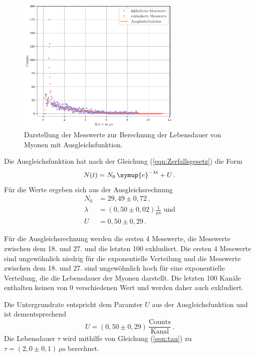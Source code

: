 \begin{figure}
  \centering
  \includegraphics[width=0.70\textwidth]{Lebensdauer_der_Myonen.pdf}
  \caption{Darstellung der Messwerte zur Berechnung der Lebensdauer von Myonen mit Ausgleichsfunktion.}
  \label{fig:Lebensdauer_Myonen}
\end{figure}

Die Ausgleichsfunktion hat nach der Gleichung (\ref{eqn:Zerfallsgesetz}) die Form 
$$ N(t) = N_0 \,\symup{e}^{-\lambda t} + U \,.$$
Für die Werte ergeben sich aus der Ausgleichsrechnung 
\begin{align*}
  N_0 &= 29,49 \pm 0,72 \, ,\\
  \lambda &= (0,50 \pm 0,02) \frac{1}{\unit{\mu\second}} \,\, \text{und}\\
  U &= 0,50 \pm 0,29 \, .
\end{align*}

Für die Ausgleichsrechnung werden 
die ersten 4 Messwerte, die Messwerte zwischen dem 18. und 27. und die letzten 100 exkludiert. Die ersten 4
Messwerte sind ungewöhnlich niedrig für die exponentielle Verteilung und die Messwerte zwischen dem 18. und 27. sind ungewöhnlich hoch für eine exponentielle Verteilung, die die Lebensdauer der Myonen darstellt. Die letzten 100 Kanäle enthalten keinen von 0 verschiedenen Wert und werden daher auch exkludiert. 

Die Untergrundrate entspricht dem Paramter $U$ aus der Ausgleichsfunktion 
und ist dementsprechend $$U = (0,50 \pm 0,29) \, \frac{\text{Counts}}{\text{Kanal}}\,.$$
Die Lebensdauer $\tau$ wird mithilfe von Gleichung (\ref{eqn:tau}) zu 
$\tau = (2,0 \pm 0,1) \, \unit{\mu\second} $ berechnet.


\FloatBarrier

